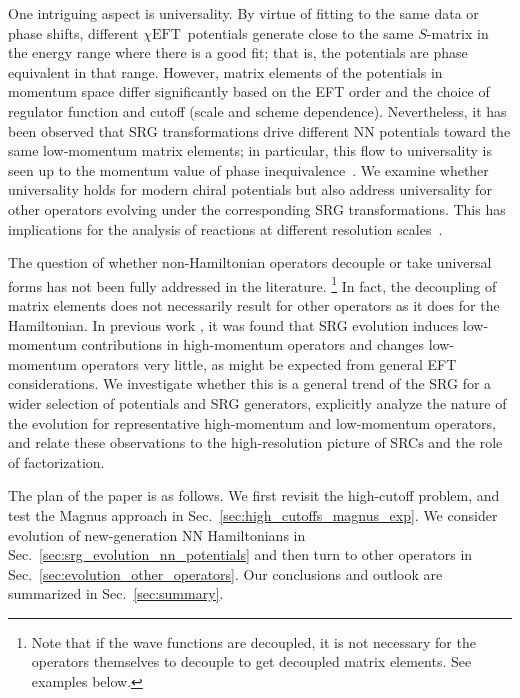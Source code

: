 \documentclass[10pt,aps,prc,floatfix,twocolumn,nofootinbib]{revtex4-1}
\newcommand{\chiEFT}{\ensuremath{\chi{\textrm{EFT}}}}
\begin{document}
One intriguing aspect is universality.
By virtue of fitting to the same data or phase shifts, different \chiEFT\ potentials generate close to the same $S$-matrix in the energy range where there is a good fit; that is, the potentials are phase equivalent in that range.
However, matrix elements of the potentials in momentum space differ significantly based on the EFT order and the choice of regulator function and cutoff (scale and scheme dependence). 
Nevertheless, it has been observed that SRG transformations drive different NN potentials toward the same low-momentum matrix elements; in particular, this flow to universality is seen up to the momentum value of phase inequivalence~\cite{Bogner:2003wn,Bogner:2001gq,Dainton:2013axa}. 
We examine whether universality holds for modern chiral potentials but also address universality for other operators evolving under the corresponding SRG transformations.
This has implications for the analysis of reactions at different resolution scales~\cite{Furnstahl:2013dsa,More:2015tpa,More:2017syr}.


The question of whether non-Hamiltonian operators decouple or take universal forms has not been fully addressed in the literature.%
\footnote{Note that if the wave functions are decoupled, it is not necessary for the operators themselves to decouple to get decoupled matrix elements. See examples below.}
In fact, the decoupling of matrix elements does not necessarily result for other operators as it does for the Hamiltonian.
In previous work \cite{Anderson:2010aq,Bogner:2012zm}, it was found that SRG evolution induces low-momentum contributions in high-momentum operators and changes low-momentum operators very little, as might be expected from general EFT considerations.
We investigate whether this is a general trend of the SRG for a wider selection of potentials and SRG generators, explicitly analyze the nature of the evolution for representative high-momentum and low-momentum operators, and relate these observations to the high-resolution picture of SRCs and the role of factorization.


The plan of the paper is as follows.
We first revisit the high-cutoff problem, and test the Magnus approach in Sec.~\ref{sec:high_cutoffs_magnus_exp}.
We consider evolution of new-generation NN Hamiltonians in Sec.~\ref{sec:srg_evolution_nn_potentials} and then turn to other operators in Sec.~\ref{sec:evolution_other_operators}.
Our conclusions and outlook are summarized in Sec.~\ref{sec:summary}.


\end{document}

